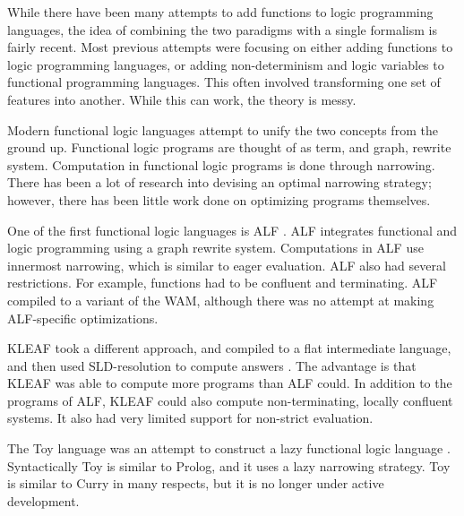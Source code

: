 
While there have been many attempts to add functions to logic programming languages,
the idea of combining the two paradigms with a single formalism is fairly recent.
Most previous attempts were focusing on either adding functions to logic programming languages,
or adding non-determinism and logic variables to functional programming languages.
This often involved transforming one set of features into another.
While this can work, the theory is messy.

Modern functional logic languages attempt to unify the two concepts from the ground up.
Functional logic programs are thought of as term, and graph, rewrite system.
Computation in functional logic programs is done through narrowing.
There has been a lot of research into devising an optimal narrowing strategy;
however, there has been little work done on optimizing programs themselves.

One of the first functional logic languages is ALF \cite{alf}.
ALF integrates functional and logic programming using a graph rewrite system.
Computations in ALF use innermost narrowing, which is similar to eager evaluation.
ALF also had several restrictions. 
For example, functions had to be confluent and terminating.
ALF compiled to a variant of the WAM, 
although there was no attempt at making ALF-specific optimizations.

KLEAF took a different approach, and compiled to a flat intermediate language, 
and then used SLD-resolution to compute answers \cite{kleaf}.
The advantage is that KLEAF was able to compute more programs than ALF could.
In addition to the programs of ALF, KLEAF could also compute non-terminating, locally confluent systems.
It also had very limited support for non-strict evaluation.

The Toy language was an attempt to construct a lazy functional logic language \cite{toy}.
Syntactically Toy is similar to Prolog, and it uses a lazy narrowing strategy.
Toy is similar to Curry in many respects, but it is no longer under active development.

